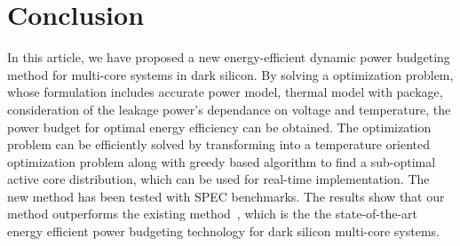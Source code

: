 \documentclass[10pt,journal,compsoc]{IEEEtran}
\begin{document}







\section{Conclusion}\label{sec:conclusion}

In this article, we have proposed a new energy-efficient dynamic power budgeting method for multi-core systems in dark silicon. By solving a optimization problem, whose formulation includes accurate power model, thermal model with package, consideration of the leakage power's dependance on voltage and temperature, the power budget for optimal energy efficiency can be obtained. The optimization problem can be efficiently solved by transforming into a temperature oriented optimization problem along with greedy based algorithm to find a sub-optimal active core distribution, which can be used for real-time implementation. The new method has been tested with SPEC benchmarks. The results show that our method
outperforms the existing method~\cite{Hanumaiah:TCOMP'14}, which is the the state-of-the-art energy efficient power budgeting technology for dark silicon multi-core systems.





\end{document}
